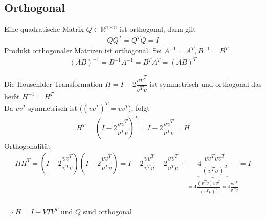 \subsection{Orthogonal}
Eine quadratische Matrix $Q \in \mathbb{R}^{n \times n}$ ist orthogonal, dann gilt
\begin{align*}
	QQ^T = Q^TQ = I
\end{align*}
Produkt orthogonaler Matrizen ist orthogonal. Sei $A^{-1} = A^T, B^{-1} = B^T$
\begin{align*}
	(AB)^{-1} = B^{-1}A^{-1} = B^TA^T = (AB)^T
\end{align*}

Die Househlder-Transformation $H=I - 2 \dfrac{vv^T}{v^Tv}$ ist symmetrisch und orthogonal das heißt $H^{-1} = H^T$\\
Da $vv^T$ symmetrisch ist ($(vv^T)^T= vv^T$), folgt
\begin{align*}
	H^T = \left(I - 2 \dfrac{vv^T}{v^Tv} \right)^T = I - 2 \dfrac{vv^T}{v^Tv} = H
\end{align*}
Orthogonalität
\begin{align*}
	HH^T = \left(I - 2 \dfrac{vv^T}{v^Tv} \right)\left(I - 2 \dfrac{vv^T}{v^Tv} \right)
	= I - 2 \dfrac{vv^T}{v^Tv} - 2 \dfrac{vv^T}{v^Tv} + \underbrace{ 4 \dfrac{vv^Tvv^T}{(v^Tv)^2}}_{=4 \dfrac{(v^Tv)vv^T}{(v^Tv)^2}=4 \dfrac{vv^T}{v^Tv}} = I
\end{align*}
\\
$\Rightarrow H=I-VTV^T$ und $Q$ sind orthogonal